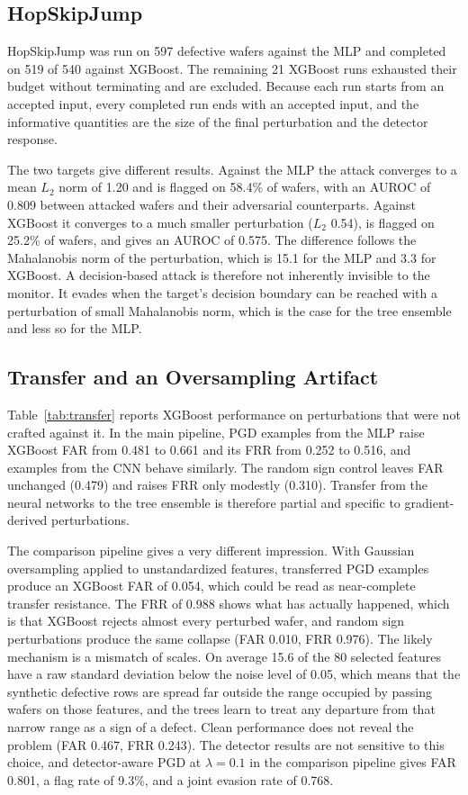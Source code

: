 \documentclass[preprint,12pt,authoryear]{elsarticle}
\begin{document}
\subsection{HopSkipJump}
HopSkipJump was run on 597 defective wafers against the MLP and completed on 519 of 540 against XGBoost. The remaining 21 XGBoost runs exhausted their budget without terminating and are excluded. Because each run starts from an accepted input, every completed run ends with an accepted input, and the informative quantities are the size of the final perturbation and the detector response.

The two targets give different results. Against the MLP the attack converges to a mean $L_2$ norm of 1.20 and is flagged on 58.4\% of wafers, with an AUROC of 0.809 between attacked wafers and their adversarial counterparts. Against XGBoost it converges to a much smaller perturbation ($L_2$ 0.54), is flagged on 25.2\% of wafers, and gives an AUROC of 0.575. The difference follows the Mahalanobis norm of the perturbation, which is 15.1 for the MLP and 3.3 for XGBoost. A decision-based attack is therefore not inherently invisible to the monitor. It evades when the target's decision boundary can be reached with a perturbation of small Mahalanobis norm, which is the case for the tree ensemble and less so for the MLP.

\subsection{Transfer and an Oversampling Artifact}
\label{sec:transfer}
Table~\ref{tab:transfer} reports XGBoost performance on perturbations that were not crafted against it. In the main pipeline, PGD examples from the MLP raise XGBoost FAR from 0.481 to 0.661 and its FRR from 0.252 to 0.516, and examples from the CNN behave similarly. The random sign control leaves FAR unchanged (0.479) and raises FRR only modestly (0.310). Transfer from the neural networks to the tree ensemble is therefore partial and specific to gradient-derived perturbations.

The comparison pipeline gives a very different impression. With Gaussian oversampling applied to unstandardized features, transferred PGD examples produce an XGBoost FAR of 0.054, which could be read as near-complete transfer resistance. The FRR of 0.988 shows what has actually happened, which is that XGBoost rejects almost every perturbed wafer, and random sign perturbations produce the same collapse (FAR 0.010, FRR 0.976). The likely mechanism is a mismatch of scales. On average 15.6 of the 80 selected features have a raw standard deviation below the noise level of 0.05, which means that the synthetic defective rows are spread far outside the range occupied by passing wafers on those features, and the trees learn to treat any departure from that narrow range as a sign of a defect. Clean performance does not reveal the problem (FAR 0.467, FRR 0.243). The detector results are not sensitive to this choice, and detector-aware PGD at $\lambda=0.1$ in the comparison pipeline gives FAR 0.801, a flag rate of 9.3\%, and a joint evasion rate of 0.768.
\end{document}
